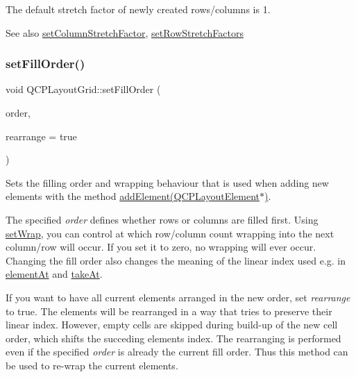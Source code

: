 The default stretch factor of newly created rows/columns is 1.

\begin{DoxySeeAlso}{See also}
\hyperlink{class_q_c_p_layout_grid_ae38f31a71687b9d7ee3104852528fb50}{set\+Column\+Stretch\+Factor}, \hyperlink{class_q_c_p_layout_grid_a200b45f9c908f96ebadaa3c8d87a2782}{set\+Row\+Stretch\+Factors} 
\end{DoxySeeAlso}
\mbox{\label{class_q_c_p_layout_grid_affc2f3cfd22f28698c5b29b960d2a391}} 
\subsubsection{\texorpdfstring{set\+Fill\+Order()}{setFillOrder()}}
{\footnotesize\ttfamily void Q\+C\+P\+Layout\+Grid\+::set\+Fill\+Order (\begin{DoxyParamCaption}\item[{\hyperlink{class_q_c_p_layout_grid_a7d49ee08773de6b2fd246edfed353cca}{Fill\+Order}}]{order,  }\item[{bool}]{rearrange = {\ttfamily true} }\end{DoxyParamCaption})}

Sets the filling order and wrapping behaviour that is used when adding new elements with the method \hyperlink{class_q_c_p_layout_grid_a4c44025dd25acd27e053cadfd448ad7b}{add\+Element(\+Q\+C\+P\+Layout\+Element$\ast$)}.

The specified {\itshape order} defines whether rows or columns are filled first. Using \hyperlink{class_q_c_p_layout_grid_ab36af18d77e4428386d02970382ee598}{set\+Wrap}, you can control at which row/column count wrapping into the next column/row will occur. If you set it to zero, no wrapping will ever occur. Changing the fill order also changes the meaning of the linear index used e.\+g. in \hyperlink{class_q_c_p_layout_grid_a4288f174082555f6bd92021bdedb75dc}{element\+At} and \hyperlink{class_q_c_p_layout_grid_a17dd220234d1bbf8835abcc666384d45}{take\+At}.

If you want to have all current elements arranged in the new order, set {\itshape rearrange} to true. The elements will be rearranged in a way that tries to preserve their linear index. However, empty cells are skipped during build-\/up of the new cell order, which shifts the succeding element\textquotesingle{}s index. The rearranging is performed even if the specified {\itshape order} is already the current fill order. Thus this method can be used to re-\/wrap the current elements.

